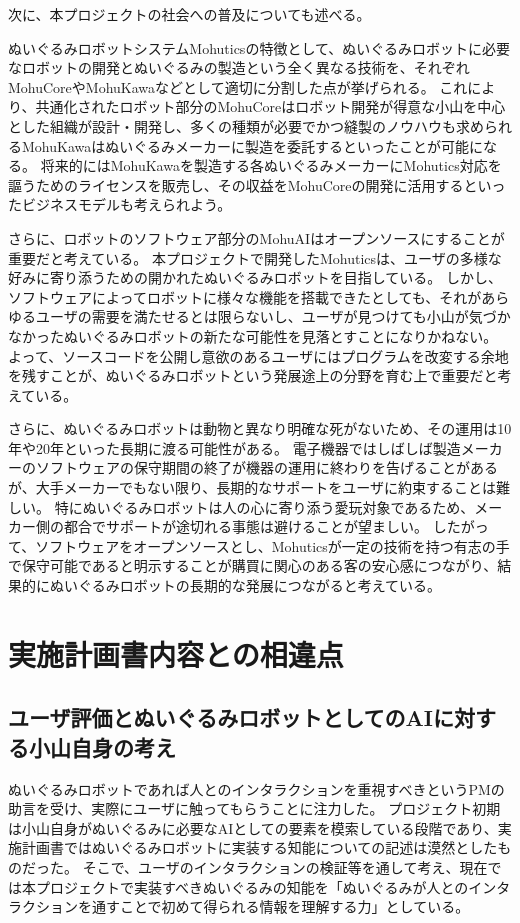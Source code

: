 \documentclass[uplatex,a4paper,12pt]{jsarticle}
\begin{document}
次に、本プロジェクトの社会への普及についても述べる。

ぬいぐるみロボットシステムMohuticsの特徴として、ぬいぐるみロボットに必要なロボットの開発とぬいぐるみの製造という全く異なる技術を、それぞれMohuCoreやMohuKawaなどとして適切に分割した点が挙げられる。
これにより、共通化されたロボット部分のMohuCoreはロボット開発が得意な小山を中心とした組織が設計・開発し、多くの種類が必要でかつ縫製のノウハウも求められるMohuKawaはぬいぐるみメーカーに製造を委託するといったことが可能になる。
将来的にはMohuKawaを製造する各ぬいぐるみメーカーにMohutics対応を謳うためのライセンスを販売し、その収益をMohuCoreの開発に活用するといったビジネスモデルも考えられよう。

さらに、ロボットのソフトウェア部分のMohuAIはオープンソースにすることが重要だと考えている。
本プロジェクトで開発したMohuticsは、ユーザの多様な好みに寄り添うための開かれたぬいぐるみロボットを目指している。
しかし、ソフトウェアによってロボットに様々な機能を搭載できたとしても、それがあらゆるユーザの需要を満たせるとは限らないし、ユーザが見つけても小山が気づかなかったぬいぐるみロボットの新たな可能性を見落とすことになりかねない。
よって、ソースコードを公開し意欲のあるユーザにはプログラムを改変する余地を残すことが、ぬいぐるみロボットという発展途上の分野を育む上で重要だと考えている。

さらに、ぬいぐるみロボットは動物と異なり明確な死がないため、その運用は10年や20年といった長期に渡る可能性がある。
電子機器ではしばしば製造メーカーのソフトウェアの保守期間の終了が機器の運用に終わりを告げることがあるが、大手メーカーでもない限り、長期的なサポートをユーザに約束することは難しい。
特にぬいぐるみロボットは人の心に寄り添う愛玩対象であるため、メーカー側の都合でサポートが途切れる事態は避けることが望ましい。
したがって、ソフトウェアをオープンソースとし、Mohuticsが一定の技術を持つ有志の手で保守可能であると明示することが購買に関心のある客の安心感につながり、結果的にぬいぐるみロボットの長期的な発展につながると考えている。


\section{実施計画書内容との相違点}
\subsection{ユーザ評価とぬいぐるみロボットとしてのAIに対する小山自身の考え}
ぬいぐるみロボットであれば人とのインタラクションを重視すべきというPMの助言を受け、実際にユーザに触ってもらうことに注力した。
プロジェクト初期は小山自身がぬいぐるみに必要なAIとしての要素を模索している段階であり、実施計画書ではぬいぐるみロボットに実装する知能についての記述は漠然としたものだった。
そこで、ユーザのインタラクションの検証等を通して考え、現在では本プロジェクトで実装すべきぬいぐるみの知能を「ぬいぐるみが人とのインタラクションを通すことで初めて得られる情報を理解する力」としている。
\end{document}
